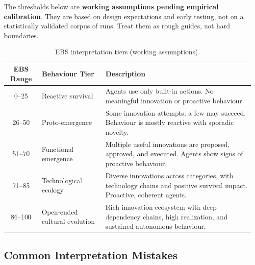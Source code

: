 \documentclass[a4paper, 11pt]{article}
\begin{document}
\begin{interpretbox}
    The thresholds below are \textbf{working assumptions pending empirical calibration}. They are based on design expectations and early testing, not on a statistically validated corpus of runs. Treat them as rough guides, not hard boundaries.
\end{interpretbox}

\begin{table}[ht]
\centering
\caption{EBS interpretation tiers (working assumptions).}
\label{tab:interpretation}
\begin{tabular}{@{}cl p{8cm}@{}}
\toprule
\textbf{EBS Range} & \textbf{Behaviour Tier} & \textbf{Description} \\
\midrule
0--25   & Reactive survival & Agents use only built-in actions. No meaningful innovation or proactive behaviour. \\
26--50  & Proto-emergence & Some innovation attempts; a few may succeed. Behaviour is mostly reactive with sporadic novelty. \\
51--70  & Functional emergence & Multiple useful innovations are proposed, approved, and executed. Agents show signs of proactive behaviour. \\
71--85  & Technological ecology & Diverse innovations across categories, with technology chains and positive survival impact. Proactive, coherent agents. \\
86--100 & Open-ended cultural evolution & Rich innovation ecosystem with deep dependency chains, high realization, and sustained autonomous behaviour. \\
\bottomrule
\end{tabular}
\end{table}

\subsection{Common Interpretation Mistakes}
\end{document}
